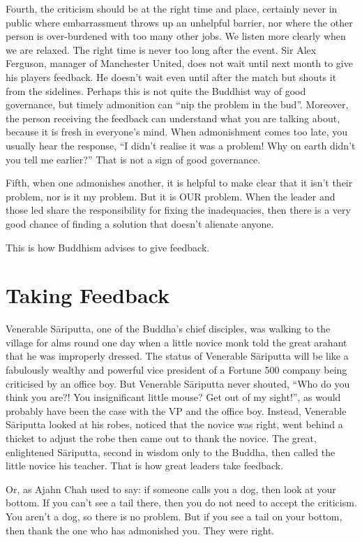 \documentclass[11pt, openany]{book}
\begin{document}
Fourth, the criticism should be at the right time and place, certainly never in public where embarrassment throws up an unhelpful barrier, nor where the other person is over-burdened with too many other jobs. We listen more clearly when we are relaxed. The right time is never too long after the event. Sir Alex Ferguson, manager of Manchester United, does not wait until next month to give his players feedback. He doesn’t wait even until after the match but shouts it from the sidelines. Perhaps this is not quite the Buddhist way of good governance, but timely admonition can “nip the problem in the bud”. Moreover, the person receiving the feedback can understand what you are talking about, because it is fresh in everyone’s mind. When admonishment comes too late, you usually hear the response, “I didn’t realise it was a problem! Why on earth didn’t you tell me earlier?” That is not a sign of good governance.

Fifth, when one admonishes another, it is helpful to make clear that it isn’t their problem, nor is it my problem. But it is OUR problem. When the leader and those led share the responsibility for fixing the inadequacies, then there is a very good chance of finding a solution that doesn’t alienate anyone.

This is how Buddhism advises to give feedback.

\section{Taking Feedback}

Venerable Sāri\-putta, one of the Buddha’s chief disciples, was walking to the village for alms round one day when a little novice monk told the great arahant that he was improperly dressed. The status of Venerable Sāri\-putta will be like a fabulously wealthy and powerful vice president of a Fortune 500 company being criticised by an office boy. But Venerable Sāri\-putta never shouted, “Who do you think you are?! You insignificant little mouse? Get out of my sight!”, as would probably have been the case with the VP and the office boy. Instead, Venerable Sāri\-putta looked at his robes, noticed that the novice was right, went behind a thicket to adjust the robe then came out to thank the novice. The great, enlightened Sāri\-putta, second in wisdom only to the Buddha, then called the little novice his teacher. That is how great leaders take feedback.

Or, as Ajahn Chah used to say: if someone calls you a dog, then look at your bottom. If you can’t see a tail there, then you do not need to accept the criticism. You aren’t a dog, so there is no problem. But if you see a tail on your bottom, then thank the one who has admonished you. They were right.
\end{document}
